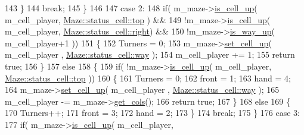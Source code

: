 \begin{DoxyCode}
143                 \}
144                 \textcolor{keywordflow}{break};
145             \}
146 
147         \textcolor{keywordflow}{case} 2:
148             \textcolor{keywordflow}{if}( m\_maze->\hyperlink{classMaze_a2b0e69e72d6c3e1037578f057946a21e}{is\_cell\_up}( m\_cell\_player, 
      \hyperlink{classMaze_a07167e321eac2b67100fb82ecb98f1d1ab28354b543375bfa94dabaeda722927f}{Maze::status\_cell::top} ) &&
149                     !m\_maze->\hyperlink{classMaze_a2b0e69e72d6c3e1037578f057946a21e}{is\_cell\_up}( m\_cell\_player, 
      \hyperlink{classMaze_a07167e321eac2b67100fb82ecb98f1d1a7c4f29407893c334a6cb7a87bf045c0d}{Maze::status\_cell::right}) && 
150                     !m\_maze->\hyperlink{classMaze_a308fa695665de6217c0e7f28aab5adda}{is\_way\_up}( m\_cell\_player+1 ))
151             \{
152                 Turners = 0;
153                 m\_maze->\hyperlink{classMaze_aa7c832a91a3db8f48b31f688332f8986}{set\_cell\_up}( m\_cell\_player , 
      \hyperlink{classMaze_a07167e321eac2b67100fb82ecb98f1d1ac83b72dd001482ce10f0b106c7a0ed0e}{Maze::status\_cell::way} );
154                 m\_cell\_player += 1;
155                 \textcolor{keywordflow}{return} \textcolor{keyword}{true};
156             \}
157             \textcolor{keywordflow}{else}
158             \{
159                 \textcolor{keywordflow}{if}( !m\_maze->\hyperlink{classMaze_a2b0e69e72d6c3e1037578f057946a21e}{is\_cell\_up}( m\_cell\_player, 
      \hyperlink{classMaze_a07167e321eac2b67100fb82ecb98f1d1ab28354b543375bfa94dabaeda722927f}{Maze::status\_cell::top} ))
160                 \{
161                     Turners = 0;
162                     front = 1;
163                     hand = 4;
164                     m\_maze->\hyperlink{classMaze_aa7c832a91a3db8f48b31f688332f8986}{set\_cell\_up}( m\_cell\_player , 
      \hyperlink{classMaze_a07167e321eac2b67100fb82ecb98f1d1ac83b72dd001482ce10f0b106c7a0ed0e}{Maze::status\_cell::way} );
165                     m\_cell\_player -= m\_maze->\hyperlink{classMaze_a8a04cd1335e96a80358181afa164d4c9}{get\_cols}();
166                     \textcolor{keywordflow}{return} \textcolor{keyword}{true};
167                 \}
168                 \textcolor{keywordflow}{else}
169                 \{
170                     Turners++;
171                     front = 3;
172                     hand = 2;
173                 \}
174                 \textcolor{keywordflow}{break};
175             \}
176         \textcolor{keywordflow}{case} 3:
177             \textcolor{keywordflow}{if}(     m\_maze->\hyperlink{classMaze_a2b0e69e72d6c3e1037578f057946a21e}{is\_cell\_up}( m\_cell\_player, 

\end{DoxyCode}
